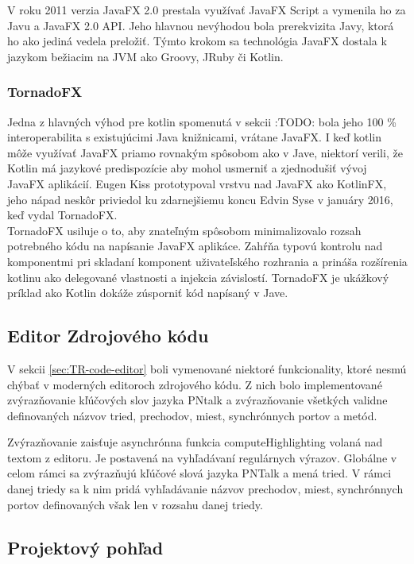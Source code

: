 V roku 2011 verzia JavaFX 2.0 prestala využívať JavaFX Script a vymenila ho za Javu a JavaFX 2.0 API. \cite{dea2011javafx}Jeho hlavnou nevýhodou bola prerekvizita Javy, ktorá ho ako jediná vedela preložiť. Týmto krokom sa technológia JavaFX dostala k jazykom bežiacim na JVM ako Groovy, JRuby či Kotlin.

\subsubsection{TornadoFX}

Jedna z hlavných výhod pre kotlin spomenutá v sekcii :TODO: bola
jeho 100 \% interoperabilita s existujúcimi Java knižnicami, vrátane JavaFX. I keď kotlin môže využívať JavaFX priamo rovnakým spôsobom ako v Jave, niektorí verili, že Kotlin má jazykové predispozície aby mohol usmerniť a zjednodušiť vývoj JavaFX aplikácií. Eugen Kiss prototypoval vrstvu nad JavaFX ako KotlinFX, jeho nápad neskôr priviedol ku zdarnejšiemu koncu Edvin Syse v januáry 2016\cite{tornadofx}, keď vydal TornadoFX.
\\
TornadoFX usiluje o to, aby znateľným spôsobom minimalizovalo rozsah potrebného kódu na napísanie JavaFX aplikáce. Zahŕňa typovú kontrolu nad komponentmi pri skladaní komponent uživateľského rozhrania a prináša rozšírenia kotlinu ako delegované vlastnosti a injekcia závislostí. TornadoFX je ukážkový príklad ako Kotlin dokáže zúsporniť kód napísaný v Jave.

\subsection{Editor Zdrojového kódu}

V sekcii \ref{sec:TR-code-editor} boli vymenované niektoré funkcionality, ktoré nesmú chýbať v moderných editoroch zdrojového kódu. Z nich bolo implementované zvýrazňovanie kľúčových slov jazyka PNtalk a zvýrazňovanie všetkých validne definovaných názvov tried, prechodov, miest, synchrónnych portov a metód.

Zvýrazňovanie zaisťuje asynchrónna funkcia computeHighlighting volaná nad textom z editoru. Je postavená na vyhľadávaní regulárnych výrazov. Globálne v celom rámci sa zvýrazňujú kľúčové slová jazyka PNTalk a mená tried. V rámci danej triedy sa k nim pridá vyhľadávanie názvov prechodov, miest, synchrónnych portov definovaných však len v rozsahu danej triedy.

\subsection{Projektový pohľad}

